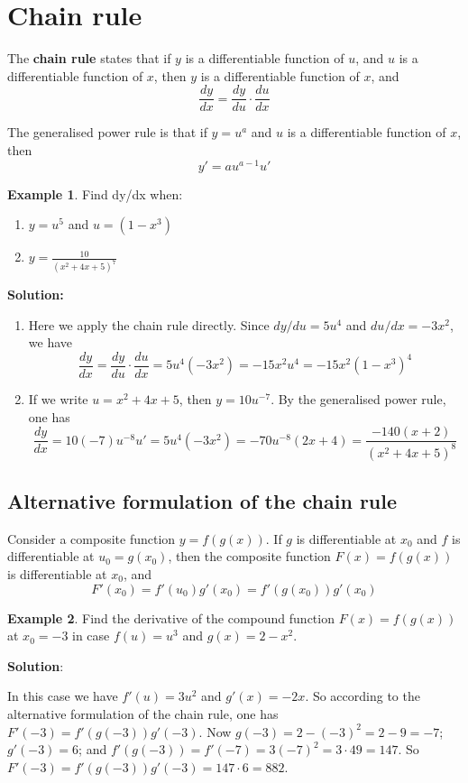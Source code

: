 \documentclass[10pt,a4paper]{book}
\theoremstyle{definition}\newtheorem{definition}{Definition}
\theoremstyle{definition}\newtheorem{fact}{Fact}
\theoremstyle{definition}\newtheorem{ex}{Ex.}
\theoremstyle{definition}\newtheorem{project}{Project}
\theoremstyle{definition}\newtheorem{problem}{Problem}
\theoremstyle{definition}\newtheorem{example}{Example}
\numberwithin{theorem}{chapter}
\numberwithin{corollary}{chapter}
\numberwithin{assumption}{chapter}
\numberwithin{definition}{chapter}
\numberwithin{prop}{chapter}
\numberwithin{notation}{chapter}
\numberwithin{problem}{chapter}
\numberwithin{example}{chapter}
\numberwithin{fact}{chapter}
\numberwithin{ex}{chapter}
\begin{document}
	\section{Chain rule}
	
	The \textbf{chain rule} states that if $y$ is a differentiable function of $u$, and $u$ is a differentiable function of $x$, then $y$ is a differentiable function of $x$, and
	$$\frac{dy}{dx}= \frac{dy}{du} \cdot \frac{du}{dx}$$
	
	The generalised power rule is that if $y=u^a$ and $u$ is a differentiable function of $x$, then
	$$y' = au^{a-1}u'$$
	
	\begin{example}
		Find dy/dx when:
		\begin{enumerate}[label=(\alph*)]
			\item $y=u^5$ and $u=(1-x^3)$
			\item $y=\frac{10}{(x^2+4x+5)^7}$
		\end{enumerate}
		\textbf{Solution:}
		
		\begin{enumerate}[label=(\alph*)]
			\item Here we apply the chain rule directly. Since $dy/du = 5u^4$ and $du/dx= -3x^2$, we have
			$$\frac{dy}{dx} = \frac{dy}{du}\cdot \frac{du}{dx} = 5u^4(-3x^2) = -15x^2 u^4 = -15x^2 (1-x^3)^4$$
			\item If we write $u = x^2 + 4x + 5$, then $y = 10u^{-7}$. By the generalised power rule, one has
			$$\frac{dy}{dx} = 10(-7)u^{-8}u' = 5u^4(-3x^2) = -70u^{-8}(2x+4) = \frac{-140(x+2)}{(x^2+4x+5)^8}$$
		\end{enumerate}
	\end{example}
	
	\subsection{Alternative formulation of the chain rule}
	
	Consider a composite function $y=f(g(x))$. If $g$ is differentiable at $x_0$ and $f$ is differentiable at $u_0 = g(x_0)$, then the composite function $F(x) = f (g(x))$ is differentiable at $x_0$, and
	$$F'(x_0) = f'(u_0)g'(x_0) = f'(g(x_0))g'(x_0)$$
	
	\begin{example}
		Find the derivative of the compound function $F(x) = f (g(x))$ at $x_0 = -3$ in case $f(u)=u^3$ and $g(x) = 2-x^2$.
		
		\textbf{Solution}:
		
		In this case we have $f'(u) = 3u^2$ and $g'(x) = -2x$. So according to the alternative formulation of the chain rule, one has $F'(-3)=f'(g(-3))g'(-3)$. Now $g(-3)=2-(-3)^2 =2-9=-7$; $g'(-3)=6$; and $f'(g(-3)) = f'(-7) = 3(-7)^2 = 3 \cdot 49 = 147$. So $F'(-3) = f'(g(-3))g'(-3) = 147 \cdot 6 = 882$.
	\end{example}
	
\end{document}
